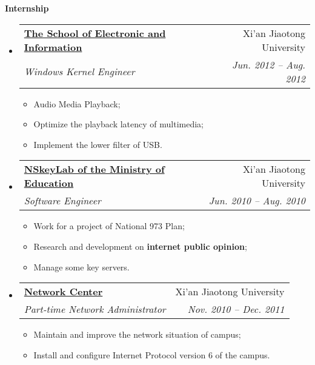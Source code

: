\documentclass[letterpaper,11pt]{article}
\makeatletter
\newcommand{\resitem}[1]{\item #1 \vspace{-2pt}}
\newcommand{\resheading}[1]{{\large \colorbox{mygrey}{\begin{minipage}{\textwidth}{\textbf{#1 \vphantom{p\^{E}}}}\end{minipage}}}}
\newcommand{\ressubheading}[4]{
\begin{tabular*}{6.5in}{l@{\extracolsep{\fill}}r}
		\textbf{#1} & #2 \\
		\textit{#3} & \textit{#4} \\
\end{tabular*}\vspace{-6pt}}
\makeatother
\begin{document}
\resheading{Internship}
	\begin{itemize}
		\item 
			\ressubheading{\href{http://eie.xjtu.edu.cn/}{The School of Electronic and Information}}{Xi'an Jiaotong University}{Windows Kernel Engineer}{Jun. 2012 -- Aug. 2012}
				{ \footnotesize
				\begin{itemize}
					\resitem{Audio Media Playback;}
					\resitem{Optimize the playback latency of multimedia;}
					\resitem{Implement the lower filter of USB.}
				\end{itemize}
				}
		\item 
			\ressubheading{\href{http://nskeylab.xjtu.edu.cn/}{NSkeyLab of the Ministry of Education}}{Xi'an Jiaotong University}{Software Engineer}{Jun. 2010 -- Aug. 2010}
				{ \footnotesize
				\begin{itemize}
					\resitem{Work for a project of National 973 Plan;}
					\resitem{Research and development on \textbf{internet public opinion};}
					\resitem{Manage some key servers.}
				\end{itemize}
				}
		\item
			\ressubheading{\href{http://nic.xjtu.edu.cn}{Network Center}}{Xi'an Jiaotong University}{Part-time Network Administrator}{Nov. 2010 -- Dec. 2011}
				{ \footnotesize
				\begin{itemize}
					\resitem{Maintain and improve the network situation of campus;}
					\resitem{Install and configure Internet Protocol version 6 of the campus.}
				\end{itemize}
          		}
	\end{itemize}
\end{document}
